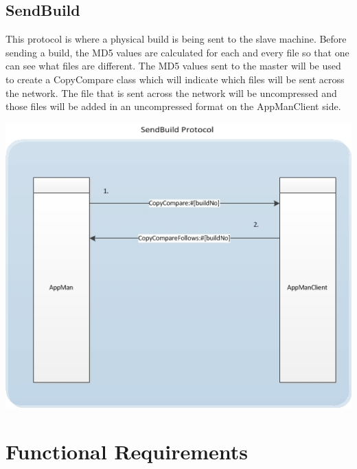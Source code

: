 \documentclass[a4paper,12pt,final]{article}
\begin{document}
\subsection{SendBuild}
This protocol is where a physical build is being sent to the slave machine. Before sending a build, the MD5 values are calculated for each and every file so that one can see what files are different. The MD5 values sent to the master will be used to create a CopyCompare class which will indicate which files will be sent across the network. The file that is sent across the network will be uncompressed and those files will be added in an uncompressed format on the AppManClient side.
\begin{center}
\includegraphics[scale=0.85]{CommunicationProtocol/SendBuildProtocol.jpg} 
\end{center}



\section{Functional Requirements}
\end{document}
